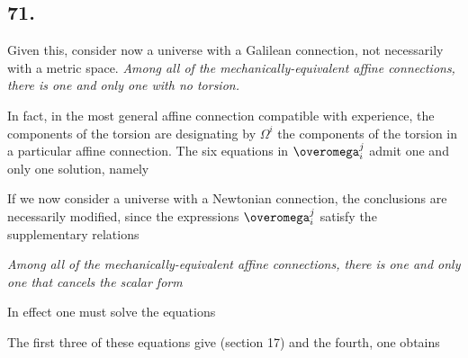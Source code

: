 \subsection*{71.}
\nc{\overOmega}{\overline{\Omega}}

Given this, consider now a universe with a Galilean connection, not necessarily with a metric space. \textit{Among all of the mechanically-equivalent affine connections, there is one and only one with no torsion.}

In fact, in the most general affine connection compatible with experience, the components of the torsion are
designating by $\Omega^i$ the components of the torsion in a particular affine connection. The six equations in $\overomega_i^j$
admit one and only one solution, namely

If we now consider a universe with a Newtonian connection, the conclusions are necessarily modified, since the expressions $\overomega_i^j$ satisfy the supplementary relations

\textit{Among all of the mechanically-equivalent affine connections, there is one and only one that cancels the scalar form}

In effect one must solve the equations

The first three of these equations give (section 17)
and  the fourth, one obtains

